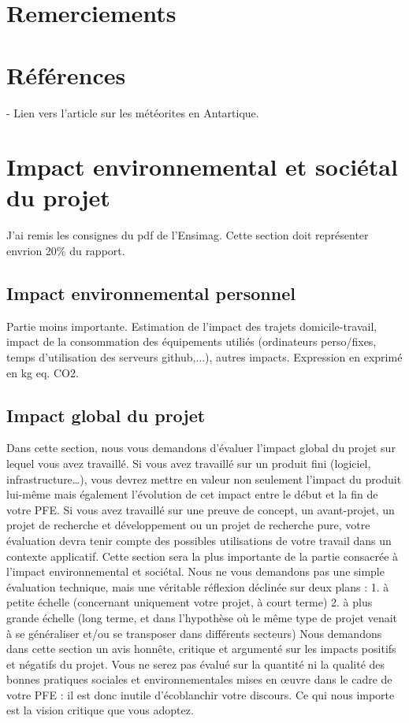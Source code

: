\documentclass[12pt]{article}
\begin{document}
\section{Remerciements}
\section{Références}
\printbibliography
- Lien vers l'article sur les météorites en Antartique.
\section{Impact environnemental et sociétal du projet}
J'ai remis les consignes du pdf de l'Ensimag. Cette section doit représenter envrion 20\% du rapport.
\subsection{Impact environnemental personnel}
Partie moins importante.
Estimation de l'impact des trajets domicile-travail, impact de la consommation des équipements utiliés (ordinateurs perso/fixes, temps d'utilisation des serveurs github,...), autres impacts.
Expression en exprimé en kg eq. CO2.

\subsection{Impact global du projet}
Dans cette section, nous vous demandons d’évaluer l’impact global du projet sur lequel vous avez travaillé. Si vous avez travaillé sur un produit fini (logiciel, infrastructure…), vous devrez mettre en valeur non seulement l’impact du produit lui-même mais également l’évolution de cet impact entre le début et la fin de votre PFE. Si vous avez travaillé sur une preuve de concept, un avant-projet, un projet de recherche et développement ou un projet de recherche pure, votre évaluation devra tenir compte des possibles utilisations de votre travail dans un contexte applicatif. Cette section sera la plus importante de la partie consacrée à l’impact environnemental et sociétal. Nous ne vous demandons pas une simple évaluation technique, mais une véritable réflexion déclinée sur deux plans :
1. à petite échelle (concernant uniquement votre projet, à court terme)
2. à plus grande échelle (long terme, et dans l’hypothèse où le même type de projet venait à se généraliser et/ou
se transposer dans différents secteurs)
Nous demandons dans cette section un avis honnête, critique et argumenté sur les impacts positifs et négatifs du projet. Vous ne serez pas évalué sur la quantité ni la qualité des bonnes pratiques sociales et environnementales mises en œuvre dans le cadre de votre PFE : il est donc inutile d’écoblanchir votre discours. Ce qui nous importe est la vision critique que vous adoptez.
\end{document}
